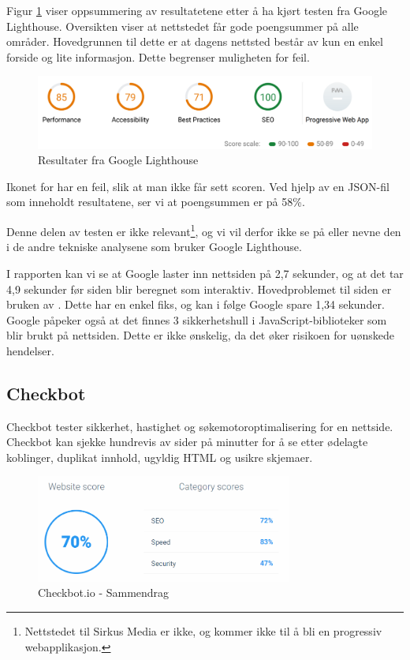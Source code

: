 Figur \ref{fig:analysis-current-lightouse-summary} viser oppsummering av resultatetene etter å ha kjørt testen fra Google Lighthouse. Oversikten viser at nettstedet får gode poengsummer på alle områder. Hovedgrunnen til dette er at dagens nettsted består av kun en enkel forside og lite informasjon. Dette begrenser muligheten for feil.

\begin{figure}[H]
    \centering
    \includegraphics[width=\textwidth]{bjornar/Lighthouse-Report-mobile.png}
    \caption{Resultater fra Google Lighthouse}
    \label{fig:analysis-current-lightouse-summary}
\end{figure}

Ikonet for  har en feil, slik at man ikke får sett scoren. Ved hjelp av en JSON-fil som inneholdt resultatene, ser vi at poengsummen er på 58\%.

Denne delen av testen er ikke relevant\footnote{Nettstedet til Sirkus Media er ikke, og kommer ikke til å bli en progressiv webapplikasjon.}, og vi vil derfor ikke se på eller nevne den i de andre tekniske analysene som bruker Google Lighthouse.

I rapporten kan vi se at Google laster inn nettsiden på 2,7 sekunder, og at det tar 4,9 sekunder før siden blir beregnet som interaktiv. Hovedproblemet til siden er bruken av . Dette har en enkel fiks, og kan i følge Google spare 1,34 sekunder. Google påpeker også at det finnes 3 sikkerhetshull i JavaScript-biblioteker som blir brukt på nettsiden. Dette er ikke ønskelig, da det øker risikoen for uønskede hendelser.

\subsection{Checkbot}
Checkbot \cite{checkbot2019cth} tester sikkerhet, hastighet og søkemotoroptimalisering for en nettside. Checkbot kan sjekke hundrevis av sider på minutter for å se etter ødelagte koblinger, duplikat innhold, ugyldig HTML og usikre skjemaer.

\begin{figure}[H]
    \centering
    \includegraphics[width=0.75\textwidth]{bjornar/checkbotio-summary.png}
    \caption{Checkbot.io - Sammendrag}
    \label{fig:analysis-current-checkbot-summary}
\end{figure}

